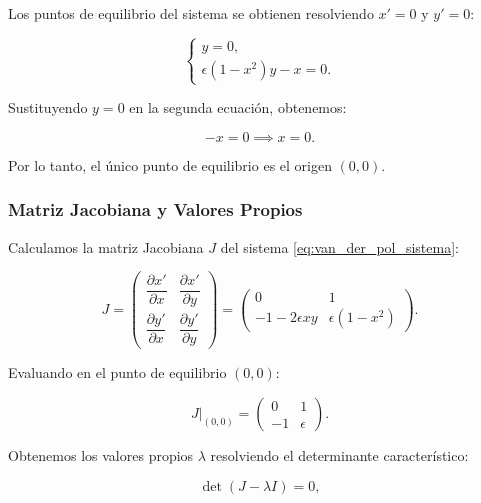 \documentclass[12pt, a4paper]{report}
\begin{document}
Los puntos de equilibrio del sistema se obtienen resolviendo \(x' = 0\) y \(y' = 0\):

\begin{equation}
    \begin{cases}
        y = 0, \\
        \epsilon (1 - x^2) y - x = 0.
    \end{cases}
\end{equation}

Sustituyendo \( y = 0 \) en la segunda ecuación, obtenemos:

\begin{equation}
    -x = 0 \implies x = 0.
\end{equation}

Por lo tanto, el único punto de equilibrio es el origen \((0, 0)\).

\subsubsection*{Matriz Jacobiana y Valores Propios}

Calculamos la matriz Jacobiana \( J \) del sistema \eqref{eq:van_der_pol_sistema}:

\begin{equation}
    J = 
    \begin{pmatrix}
        \dfrac{\partial x'}{\partial x} & \dfrac{\partial x'}{\partial y} \\
        \dfrac{\partial y'}{\partial x} & \dfrac{\partial y'}{\partial y}
    \end{pmatrix}
    =
    \begin{pmatrix}
        0 & 1 \\
        -1 - 2\epsilon x y & \epsilon (1 - x^2)
    \end{pmatrix}.
\end{equation}

Evaluando en el punto de equilibrio \((0, 0)\):

\begin{equation}
    J|_{(0,0)} = 
    \begin{pmatrix}
        0 & 1 \\
        -1 & \epsilon
    \end{pmatrix}.
\end{equation}

Obtenemos los valores propios \(\lambda\) resolviendo el determinante característico:

\begin{equation}
    \det(J - \lambda I) = 0,
\end{equation}
\end{document}
